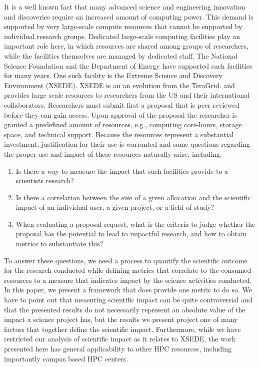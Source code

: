 \documentclass{sig-alternate}
\begin{document}
It is a well known fact that many advanced science and engineering innovation and discoveries  require an increased amount of computing power. This demand is supported by  very large-scale compute resources that cannot be supported by individual research groups. Dedicated large-scale computing facilities play an important role here, in which resources are shared among groups of researchers, while the facilities themselves are managed by dedicated staff. The National Science Foundation and the Department of Energy have supported such facilities for many years. One such facility is the Extreme Science and Discovery Environment (XSEDE). XSEDE is an an evolution from the TeraGrid. \cite{www-xsede} and provides large scale resources to researchers from the US and their international collaborators. Researchers must submit first a proposal that is peer reviewed before they can gain access. Upon approval of the proposal the researcher is granted a predefined amount of resources, e.g., computing core-hours, storage space, and technical support. Because the resources represent a substantial investment, justification for their use is warranted and some questions regarding the proper use and impact of these resources naturally arise, including:
 
\begin{enumerate} 
\item Is there a way to measure the impact that such facilities provide to a scientists research?
 
\item Is there a correlation between the size of a given allocation and the scientific impact of an individual user, a given project, or a field of study?  
 
\item When evaluating a proposal request, what is the criteria to judge whether the proposal has the potential to lead to impactful research, and how to obtain metrics to substantiate this? 
\end{enumerate} 
 
To answer these questions, we need a process to quantify the scientific outcome for the research conducted while defining metrics that correlate to the consumed resources to a measure that indicates impact by the science activities conducted. In this paper, we present a framework that does provide one metric to do so. We have to point out that measuring scientific impact can be quite controversial and that the presented results do not necessarily represent an absolute value of the impact a science project has, but the results we present project one of many factors that together define the scientific impact.
Furthermore, while we have restricted our analysis of scientific impact as it relates to XSEDE, the work presented here has general applicability to other HPC resources, including importantly campus based HPC centers.  
\end{document}
